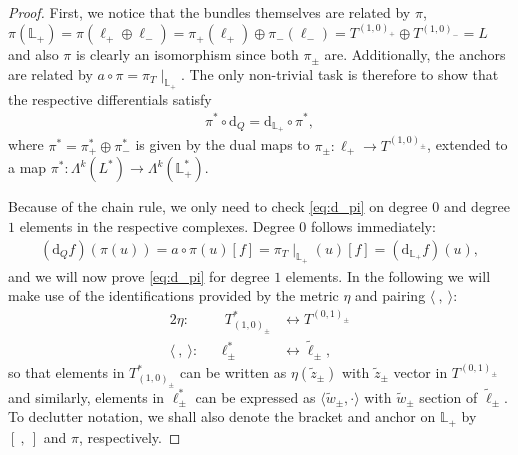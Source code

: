 \documentclass[letterpaper,12pt]{article}
\newcommand{\rd}{\mathrm{d}}
\newcommand{\Lb}{\mathbb{L}}
\newcommand{\ellt}{{\tl{\ell}}}
\newcommand{\la}{\langle}
\newcommand{\ra}{\rangle}
\newcommand{\lara}{\la\ ,\ \ra}
\newcommand{\brac}{[\ ,\ ]}
\def\tl{\tilde}
\theoremstyle{definition}
\theoremstyle{remark}
\theoremstyle{examples}
\begin{document}
\begin{proof}
First, we notice that the bundles themselves are related by $\pi$,  $\pi(\Lb_+)=\pi(\ell_+\oplus \ell_-)=\pi_+(\ell_+)\oplus \pi_-(\ell_-)=T^{(1,0)_+}\oplus T^{(1,0)_-}=L$ and also $\pi$ is clearly an isomorphism since both $\pi_\pm$ are. Additionally, the anchors are related by $a\circ\pi=\pi_T\!\!\mid_{\Lb_+}$. The only non-trivial task is therefore to show that the respective differentials satisfy
\begin{align}\label{eq:d_pi}
\pi^*\circ\rd_Q  =\rd_{\Lb_+}\circ \pi^*,
\end{align}
where $\pi^*=\pi^*_+\oplus\pi_-^*$ is given by the dual maps to $\pi_\pm:\ell_+\rightarrow T^{(1,0)_\pm}$, extended to a map $\pi^*:\Lambda^k(L^*)\rightarrow\Lambda^k(\Lb_+^*)$.

Because of the chain rule, we only need to check \eqref{eq:d_pi} on degree $0$ and degree $1$ elements in the respective complexes. Degree $0$ follows immediately:
\begin{align*}
(\rd_Q f)(\pi(u))= a\circ \pi(u)[f]=\pi_T\!\!\mid_{\Lb_+}(u)[f]=(\rd_{\Lb_+}f)(u),
\end{align*}
and we will now prove \ref{eq:d_pi} for degree $1$ elements. In the following we will make use of the identifications provided by the metric $\eta$ and pairing $\lara$:
\begin{alignat*}{2}
\eta:&&\  T^*_{(1,0)_\pm} &\leftrightarrow T^{(0,1)_\pm}\\
\lara:&& \ell^*_\pm &\leftrightarrow \ellt_\pm,
\end{alignat*}
so that elements in $T^*_{(1,0)_\pm}$ can be written as $\eta(\tl{z}_\pm)$ with $\tl{z}_\pm$ vector in $T^{(0,1)_\pm}$ and similarly, elements in $\ell^*_\pm$ can be expressed as $\la \tl{w}_\pm, \cdot\ra$ with $\tl{w}_\pm$ section of $\ellt_\pm$. To declutter notation, we shall also denote the bracket and anchor on $\Lb_+$ by $\brac$ and $\pi$, respectively.


\end{proof}
\end{document}
